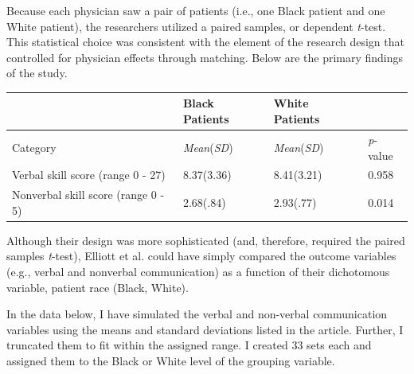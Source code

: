 \documentclass[
  11pt,
]{book}
\begin{document}
Because each physician saw a pair of patients (i.e., one Black patient and one White patient), the researchers utilized a paired samples, or dependent \emph{t}-test. This statistical choice was consistent with the element of the research design that controlled for physician effects through matching. Below are the primary findings of the study.

\begin{longtable}[]{@{}llll@{}}
\toprule()
& Black Patients & White Patients & \\
\midrule()
\endhead
Category & \emph{Mean}(\emph{SD}) & \emph{Mean}(\emph{SD}) & \emph{p}-value \\
Verbal skill score (range 0 - 27) & 8.37(3.36) & 8.41(3.21) & 0.958 \\
Nonverbal skill score (range 0 - 5) & 2.68(.84) & 2.93(.77) & 0.014 \\
\bottomrule()
\end{longtable}

Although their design was more sophisticated (and, therefore, required the paired samples \emph{t}-test), Elliott et al. \citeyearpar{elliott_differences_2016} could have simply compared the outcome variables (e.g., verbal and nonverbal communication) as a function of their dichotomous variable, patient race (Black, White).

In the data below, I have simulated the verbal and non-verbal communication variables using the means and standard deviations listed in the article. Further, I truncated them to fit within the assigned range. I created 33 sets each and assigned them to the Black or White level of the grouping variable.
\end{document}
